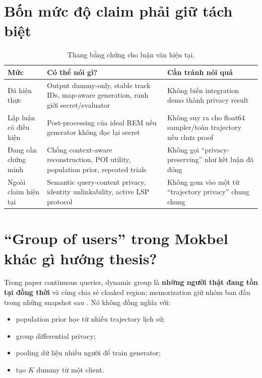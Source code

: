 \documentclass[11pt,a4paper,oneside]{report}
\begin{document}
\section{Bốn mức độ claim phải giữ tách biệt}

\begin{table}[htbp]
\centering
\small
\caption{Thang bằng chứng cho luận văn hiện tại.}
\label{tab:claim-ladder}
\begin{tabularx}{\textwidth}{P{3.3cm}Y Y}
\toprule
\textbf{Mức} & \textbf{Có thể nói gì?} & \textbf{Cần tránh nói quá}\\
\midrule
Đã hiện thực & Output dummy-only, stable track IDs, map-aware generation, ranh giới secret/evaluator & Không biến integration demo thành privacy result\\
Lập luận có điều kiện & Post-processing của ideal REM nếu generator không đọc lại secret & Không suy ra cho float64 sampler/toàn trajectory nếu chưa proof\\
Đang cần chứng minh & Chống context-aware reconstruction, POI utility, population prior, repeated trials & Không gọi ``privacy-preserving'' như kết luận đã đóng\\
Ngoài claim hiện tại & Semantic query-content privacy, identity unlinkability, active LSP protocol & Không gom vào một từ ``trajectory privacy'' chung chung\\
\bottomrule
\end{tabularx}
\end{table}

\section{``Group of users'' trong Mokbel khác gì hướng thesis?}

Trong paper continuous queries, dynamic group là \textbf{những người thật đang tồn
tại đồng thời} và cùng chia sẻ cloaked region; memorization giữ nhóm ban đầu trong
những snapshot sau \cite{chow2007continuous}. Nó không đồng nghĩa với:

\begin{itemize}
  \item population prior học từ nhiều trajectory lịch sử;
  \item group differential privacy;
  \item pooling dữ liệu nhiều người để train generator;
  \item tạo $K$ dummy từ một client.
\end{itemize}
\end{document}
